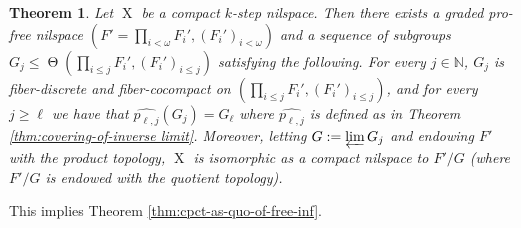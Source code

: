 \documentclass[a4paper,12pt,reqno]{amsart}
\newtheorem{theorem}{Theorem}[section]
\theoremstyle{definition}
\newcommand{\mb}{\mathbb}
\DeclareMathOperator{\tran}{\Theta}
\DeclareMathOperator{\ns}{X}
\begin{document}
\begin{theorem}\label{thm:cpct-as-quotient-of-infinite-free}
Let $\ns$ be a compact $k$-step nilspace. Then there exists a graded pro-free nilspace $(F'=\prod_{i<\omega} F_i',(F_i')_{i<\omega})$ and a sequence of subgroups $G_j\le \tran(\prod_{i\le j} F_i',(F_i')_{i\le j})$ satisfying the following. For every $j\in \mb{N}$, $G_j$ is fiber-discrete and fiber-cocompact on $(\prod_{i\le j} F_i',(F_i')_{i\le j})$, and for every $j\ge \ell$ we have that $\widehat{p_{\ell,j}}(G_j)=G_\ell$ where $\widehat{p_{\ell,j}}$ is defined as in Theorem \ref{thm:covering-of-inverse limit}. Moreover, letting $G:=\varprojlim G_j$ and endowing $F'$ with the product topology, $\ns$ is isomorphic as a compact nilspace to $F'/G$ (where $F'/G$ is endowed with the quotient topology).  
\end{theorem}
This implies Theorem \ref{thm:cpct-as-quo-of-free-inf}.
\end{document}
